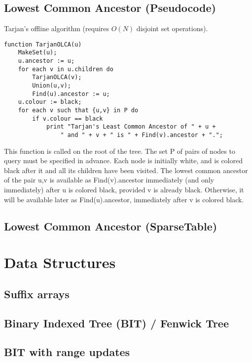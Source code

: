 \documentclass[10pt]{extarticle}
\begin{document}
\begin{multicols*}{3}
\subsection{Lowest Common Ancestor (Pseudocode)} %
Tarjan's offline algorithm (requires $O(N)$ disjoint set operations).
\begin{lstlisting}
function TarjanOLCA(u)
    MakeSet(u);
    u.ancestor := u;
    for each v in u.children do
        TarjanOLCA(v);
        Union(u,v);
        Find(u).ancestor := u;
    u.colour := black;
    for each v such that {u,v} in P do
        if v.colour == black
            print "Tarjan's Least Common Ancestor of " + u +
                " and " + v + " is " + Find(v).ancestor + ".";
\end{lstlisting}
This function is called on the root of the tree. The set P of pairs of nodes to
query must be specified in advance. Each node is initially white, and is
colored black after it and all its children have been visited. The lowest
common ancestor of the pair {u,v} is available as Find(v).ancestor immediately
(and only immediately) after u is colored black, provided v is already black.
Otherwise, it will be available later as Find(u).ancestor, immediately after v
is colored black.

\subsection{Lowest Common Ancestor (SparseTable)} %


\section{Data Structures}

\subsection{Suffix arrays} %


\subsection{Binary Indexed Tree (BIT) / Fenwick Tree} %


\subsection{BIT with range updates} %



\end{multicols*}
\end{document}
